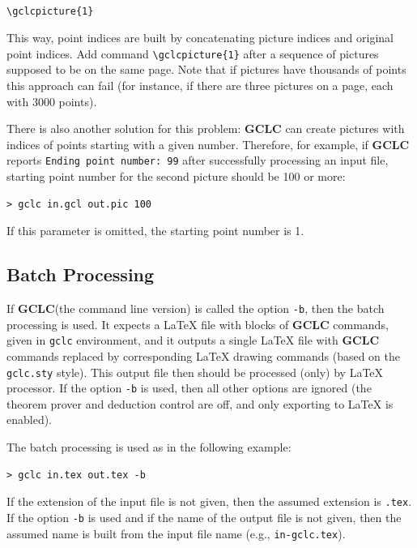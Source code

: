 \documentclass[a4paper]{book}
\newcommand{\gclc}{{\bfseries GCLC}\xspace}
\begin{document}
\begin{verbatim}

\gclcpicture{1}

\end{verbatim}

This way, point indices are built by concatenating picture indices
and original point indices. Add command \verb|\gclcpicture{1}|
after a sequence of pictures supposed to be on the same page.
Note that if pictures have thousands of points this approach can fail
(for instance, if there are three pictures on a page, each with 3000
points).

There is also another solution for this problem: \gclc can create
pictures with indices of points starting with a given number. Therefore,
for example, if \gclc reports \verb|Ending point number: 99| after
successfully processing an input file, starting point number for the
second picture should be 100 or more:

\begin{verbatim}
> gclc in.gcl out.pic 100
\end{verbatim}

\noindent
If this parameter is omitted, the starting point number is 1.


\subsection{Batch Processing}

If \gclc (the command line version) is called the option \verb|-b|,
then the batch processing is used. It expects a \LaTeX{} file with
blocks of \gclc commands, given in \verb|gclc| environment, and it
outputs a single \LaTeX{} file with \gclc commands replaced by
corresponding \LaTeX{} drawing commands (based on the \verb|gclc.sty|
style). This output file then should be processed (only) by \LaTeX{}
processor. If the option \verb|-b| is used, then all other options are
ignored (the theorem prover and deduction control are off, and only
exporting to \LaTeX{} is enabled).

The batch processing is used as in the following example:

\begin{verbatim}
> gclc in.tex out.tex -b
\end{verbatim}

If the extension of the input file is not given, then the assumed
extension is \verb|.tex|.
If the option \verb|-b| is used and if the name of the output
file is not given, then the assumed name is built from the input
file name (e.g., \verb|in-gclc.tex|).
\end{document}
